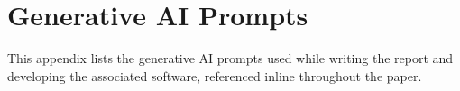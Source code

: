 \section{Generative AI Prompts}
\label{app:ai-prompts}

This appendix lists the generative AI prompts used while writing the report 
and developing the associated software, referenced inline throughout
the paper.















